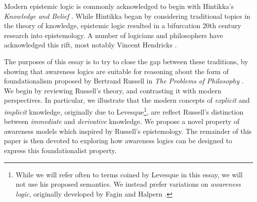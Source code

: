 Modern epistemic logic is commonly acknowledged to begin with
Hintikka's \emph{Knowledge and Belief}
\cite{hintikka_knowledge_1969}. While Hintikka began by considering
traditional topics in the theory of knowledge, epistemic logic
resulted in a bifurcation 20th century research into epistemology.  A number of
logicians and philosophers have acknowledged this rift, most notably
Vincent Hendricks \cite{hendricks_wheres_2006,
  hendricks_mainstream_2006}.

The purposes of this essay is to try to close the gap between these
traditions, by showing that awareness logics are suitable for
reasoning about the form of foundationalism proposed
by Bertrand Russell in \emph{The Problems of Philosophy}
\cite{russell_problems_1936}.  We begin by reviewing Russell's
theory, and contrasting it with modern perspectives.  In particular,
we illustrate that the modern concepts of \emph{explicit} and
\emph{implicit} knowledge, originally due to Levesque\footnote{While we will refer often to
  terms coined by Levesque in this essay, we will not use his
  proposed semantics.  We instead prefer variations on
  \emph{awareness logic}, originally developed by Fagin and Halpern
  \cite{fagin_belief_1988}.}\cite{levesque_logic_1984},  are reflect Russell's distinction between \emph{immediate} and \emph{derivative}
knowledge.  We propose a novel property of awareness models which
inspired by Russell's epistemology.  The
remainder of this paper is then devoted to exploring how awareness
logics can be designed to express this foundationalist property.


